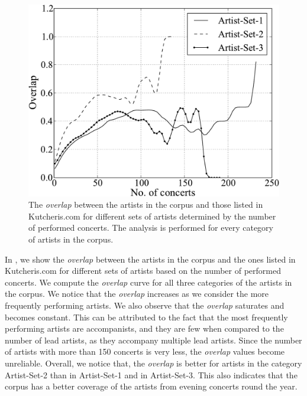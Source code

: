 \begin{figure}[h]
	\begin{center}
		\includegraphics[width=\figSizeSixtyFive]{ch04_datasets/figures/artist-coverage-vs-performances.pdf}
	\end{center}
	\caption[Overlap between the artists in the Carnatic music corpus and Kutcheris.com]{The \textit{overlap} between the artists in the corpus and those listed in Kutcheris.com for different sets of artists determined by the number of performed concerts. The analysis is performed for every category of artists in the corpus.}
	\label{fig:artist_coverage_vs_number_of_concerts}
\end{figure}

In , we show the \textit{overlap} between the artists in the corpus and the ones listed in Kutcheris.com for different sets of artists based on the number of performed concerts. We compute the \textit{overlap} curve for all three categories of the artists in the corpus. We notice that the \textit{overlap} increases as we consider the more frequently performing artists. We also observe that the \textit{overlap} saturates and becomes constant. This can be attributed to the fact that the most frequently performing artists are accompanists, and they are few when compared to the number of lead artists, as they accompany multiple lead artists. Since the number of artists with more than 150 concerts is very less, the \textit{overlap}
values become unreliable. Overall, we notice that, the \textit{overlap} is better for artists in the category Artist-Set-2 than in Artist-Set-1 and in Artist-Set-3. This also indicates that the corpus has a better coverage of the artists from evening concerts round the year.


